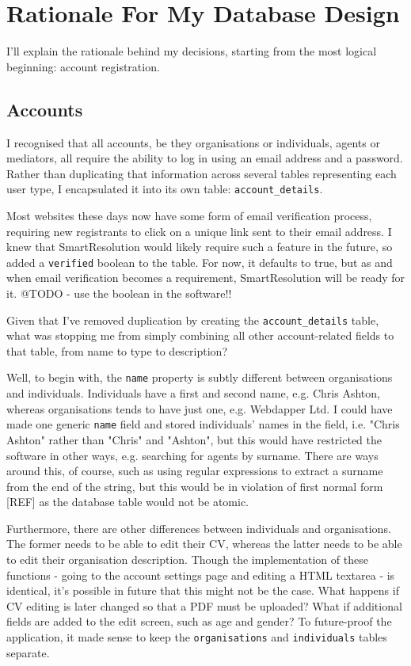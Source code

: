 \chapter{Rationale For My Database Design} \label{appendix:database}

I'll explain the rationale behind my decisions, starting from the most logical beginning: account registration.

\section{Accounts}

I recognised that all accounts, be they organisations or individuals, agents or mediators, all require the ability to log in using an email address and a password. Rather than duplicating that information across several tables representing each user type, I encapsulated it into its own table: \lstinline{account_details}.

Most websites these days now have some form of email verification process, requiring new registrants to click on a unique link sent to their email address. I knew that SmartResolution would likely require such a feature in the future, so added a \lstinline{verified} boolean to the table. For now, it defaults to true, but as and when email verification becomes a requirement, SmartResolution will be ready for it. @TODO - use the boolean in the software!!

Given that I've removed duplication by creating the \lstinline{account_details} table, what was stopping me from simply combining all other account-related fields to that table, from name to type to description?

Well, to begin with, the \lstinline{name} property is subtly different between organisations and individuals. Individuals have a first and second name, e.g. Chris Ashton, whereas organisations tends to have just one, e.g. Webdapper Ltd. I could have made one generic \lstinline{name} field and stored individuals' names in the field, i.e. "Chris Ashton" rather than "Chris" and "Ashton", but this would have restricted the software in other ways, e.g. searching for agents by surname. There are ways around this, of course, such as using regular expressions to extract a surname from the end of the string, but this would be in violation of first normal form [REF] as the database table would not be atomic.

Furthermore, there are other differences between individuals and organisations. The former needs to be able to edit their CV, whereas the latter needs to be able to edit their organisation description. Though the implementation of these functions - going to the account settings page and editing a HTML textarea - is identical, it's possible in future that this might not be the case. What happens if CV editing is later changed so that a PDF must be uploaded? What if additional fields are added to the edit screen, such as age and gender? To future-proof the application, it made sense to keep the \lstinline{organisations} and \lstinline{individuals} tables separate.

